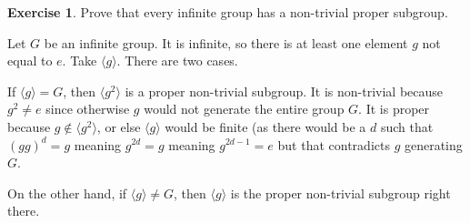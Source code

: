 \documentclass[11pt,oneside]{article}
\numberwithin{equation}{section}
\theoremstyle{definition}
\newtheorem{exercise}{Exercise}
\begin{document}
\begin{exercise}
  Prove that every infinite group has a non-trivial proper subgroup.
\end{exercise}

\begin{solution}
  Let $G$ be an infinite group.  It is infinite, so there is at least
  one element $g$ not equal to $e$.  Take $ \langle g \rangle$.  There
  are two cases.

  If $ \langle g \rangle = G $, then $ \langle g ^ 2 \rangle $
  is a proper non-trivial subgroup.  It is non-trivial
  because $g ^2 \neq e$ since otherwise $g$ would not generate the
  entire group $G$.  It is proper because $ g \notin \langle g ^ 2 \rangle $,
  or else $ \langle g \rangle $ would be finite (as there would be
  a $d$ such that $ ( g g) ^ d = g$ meaning $ g ^ {2 d} = g$ meaning $
  g ^ { 2d - 1 } = e $ but that contradicts $g$ generating $G$.

  On the other hand, if $ \langle g \rangle \neq G$, then $ \langle g \rangle $ is the
  proper non-trivial subgroup right there.  
  

\end{solution}

\begin{comment}
\begin{exercise}
  problem
\end{exercise}
\begin{solution}
\begin{enumerate}[(a)]
\item
  first answer
\end{enumerate}
\end{solution}
\end{comment}
\end{document}
